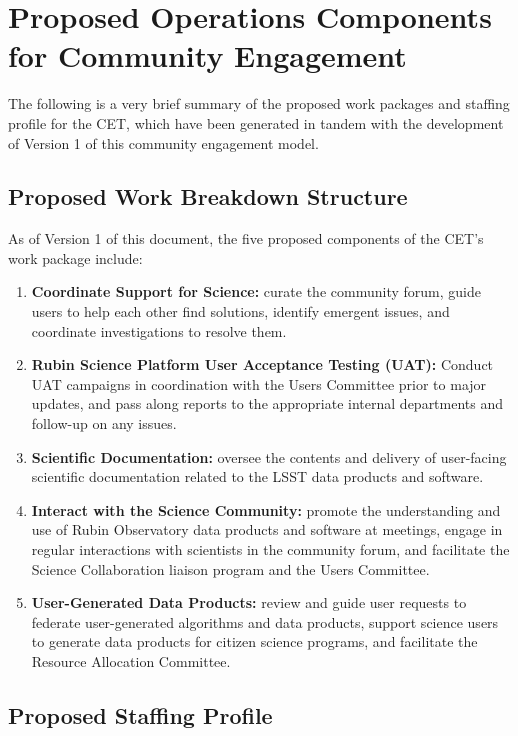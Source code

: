 \documentclass[DM,lsstdraft,toc]{lsstdoc}
\begin{document}
\section{Proposed Operations Components for Community Engagement}\label{sec:comp}

The following is a very brief summary of the proposed work packages and staffing profile for the CET, which have been generated in tandem with the development of Version 1 of this community engagement model.


\subsection{Proposed Work Breakdown Structure}\label{ssec:comp_wbs}

As of Version 1 of this document, the five proposed components of the CET's work package include:
\begin{enumerate}
\item \textbf{Coordinate Support for Science:} curate the community forum, guide users to help each other find solutions, identify emergent issues, and coordinate investigations to resolve them.
\item \textbf{Rubin Science Platform User Acceptance Testing (UAT):} Conduct UAT campaigns in coordination with the Users Committee prior to major updates, and pass along reports to the appropriate internal departments and follow-up on any issues.
\item \textbf{Scientific Documentation:} oversee the contents and delivery of user-facing scientific documentation related to the LSST data products and software. 
\item \textbf{Interact with the Science Community:} promote the understanding and use of Rubin Observatory data products and software at meetings, engage in regular interactions with scientists in the community forum, and facilitate the Science Collaboration liaison program and the Users Committee.
\item \textbf{User-Generated Data Products:} review and guide user requests to federate user-generated algorithms and data products, support science users to generate data products for citizen science programs, and facilitate the Resource Allocation Committee.
\end{enumerate}


\subsection{Proposed Staffing Profile}\label{comp_staff}
\end{document}
